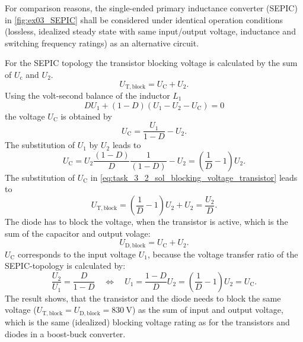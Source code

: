 \vspace{2em}\par
For comparison reasons, the single-ended primary inductance converter (SEPIC) in \autoref{fig:ex03_SEPIC} shall be considered under identical operation conditions (lossless, idealized steady state with same input/output voltage, inductance and switching frequency ratings) as an alternative circuit.



\begin{solutionblock}
	For the SEPIC topology the transistor blocking voltage is calculated by the sum of
	$U_\mathrm{c}$ and $U_\mathrm{2}$.
	\begin{equation}
		U_\mathrm{T,block}=U_\mathrm{C}+U_\mathrm{2}.
		\label{eq:task_3_2_sol_blocking_voltage_transistor}
	\end{equation}
	Using the volt-second balance of the inductor $L_1$
	\begin{equation}
		DU_\mathrm{1}+\left(1-D\right)\left(U_\mathrm{1}-U_\mathrm{2}-U_\mathrm{C}\right)=0
	\end{equation}
	the voltage $U_\mathrm{C}$ is obtained by
	\begin{equation}
		U_\mathrm{C}=\frac{U_\mathrm{1}}{1-D}-U_\mathrm{2}.
	\end{equation}
	The substitution of $U_\mathrm{1}$ by $U_\mathrm{2}$ leads to
	\begin{equation}
		U_\mathrm{C}=U_\mathrm{2}\frac{\left(1-D\right)}{D}\frac{1}{\left(1-D\right)}-U_\mathrm{2}
		=\left( \frac{1}{D}-1\right) U_\mathrm{2}.
		\label{eq:ucapacitor}
	\end{equation}
	The substitution of $U_\mathrm{C}$ in \eqref{eq:task_3_2_sol_blocking_voltage_transistor} leads to
	\begin{equation}
		U_\mathrm{T,block}=\left( \frac{1}{D}-1\right) U_\mathrm{2}+U_\mathrm{2}=\frac{U_\mathrm{2}}{D}.
	\end{equation}
	The diode has to block the voltage, when the transistor is active, which is the sum of the capacitor and output volage:
	\begin{equation}
		U_\mathrm{D,block} = U_\mathrm{C}+U_\mathrm{2}.
	\end{equation}
	$U_\mathrm{C}$ corresponds to the input voltage $U_\mathrm{1}$, because the voltage transfer ratio of the SEPIC-topology is calculated by:
	\begin{equation}
		\frac{U_\mathrm{2}}{U_\mathrm{1}}= \frac{D}{1-D} \quad \Leftrightarrow \quad
		U_\mathrm{1}=\frac{1-D}{D}U_\mathrm{2}=\left( \frac{1}{D}-1\right)U_\mathrm{2}=U_\mathrm{C}.
	\end{equation}
	The result shows, that the transistor and the diode needs to block the same voltage ($U_\mathrm{T,block}=U_\mathrm{D,block}=\SI{830}{\volt}$) as the sum of input and output voltage, which is the same (idealized) blocking voltage rating as for the transistors and diodes in a boost-buck converter.
\end{solutionblock}

